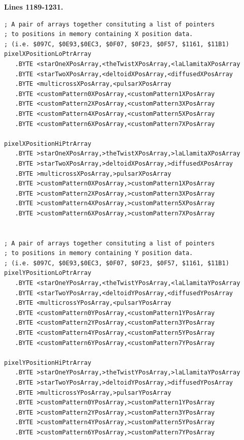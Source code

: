 \clearpage
\textbf{Lines 1189-1231. } 
\begin{lstlisting}[caption = All the pattern data structures in Psychedelia organized into a set of arrays. 
We use these arrays to choose the correct user-selected pattern at painting time.]
; A pair of arrays together consituting a list of pointers
; to positions in memory containing X position data.
; (i.e. $097C, $0E93,$0EC3, $0F07, $0F23, $0F57, $1161, $11B1)
pixelXPositionLoPtrArray
   .BYTE <starOneXPosArray,<theTwistXPosArray,<laLlamitaXPosArray
   .BYTE <starTwoXPosArray,<deltoidXPosArray,<diffusedXPosArray
   .BYTE <multicrossXPosArray,<pulsarXPosArray
   .BYTE <customPattern0XPosArray,<customPattern1XPosArray
   .BYTE <customPattern2XPosArray,<customPattern3XPosArray
   .BYTE <customPattern4XPosArray,<customPattern5XPosArray
   .BYTE <customPattern6XPosArray,<customPattern7XPosArray

pixelXPositionHiPtrArray 
   .BYTE >starOneXPosArray,>theTwistXPosArray,>laLlamitaXPosArray
   .BYTE >starTwoXPosArray,>deltoidXPosArray,>diffusedXPosArray
   .BYTE >multicrossXPosArray,>pulsarXPosArray
   .BYTE >customPattern0XPosArray,>customPattern1XPosArray
   .BYTE >customPattern2XPosArray,>customPattern3XPosArray
   .BYTE >customPattern4XPosArray,>customPattern5XPosArray
   .BYTE >customPattern6XPosArray,>customPattern7XPosArray


; A pair of arrays together consituting a list of pointers
; to positions in memory containing Y position data.
; (i.e. $097C, $0E93,$0EC3, $0F07, $0F23, $0F57, $1161, $11B1)
pixelYPositionLoPtrArray 
   .BYTE <starOneYPosArray,<theTwistYPosArray,<laLlamitaYPosArray
   .BYTE <starTwoYPosArray,<deltoidYPosArray,<diffusedYPosArray
   .BYTE <multicrossYPosArray,<pulsarYPosArray
   .BYTE <customPattern0YPosArray,<customPattern1YPosArray
   .BYTE <customPattern2YPosArray,<customPattern3YPosArray
   .BYTE <customPattern4YPosArray,<customPattern5YPosArray
   .BYTE <customPattern6YPosArray,<customPattern7YPosArray

pixelYPositionHiPtrArray 
   .BYTE >starOneYPosArray,>theTwistYPosArray,>laLlamitaYPosArray
   .BYTE >starTwoYPosArray,>deltoidYPosArray,>diffusedYPosArray
   .BYTE >multicrossYPosArray,>pulsarYPosArray
   .BYTE >customPattern0YPosArray,>customPattern1YPosArray
   .BYTE >customPattern2YPosArray,>customPattern3YPosArray
   .BYTE >customPattern4YPosArray,>customPattern5YPosArray
   .BYTE >customPattern6YPosArray,>customPattern7YPosArray

\end{lstlisting}
\clearpage

